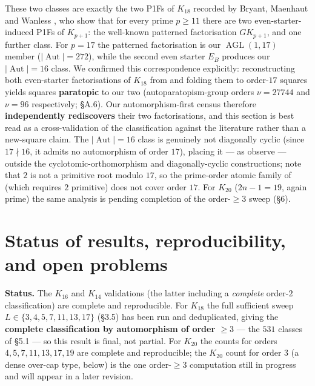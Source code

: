 \documentclass[11pt,reqno]{amsart}
\theoremstyle{plain}
\theoremstyle{definition}
\numberwithin{theorem}{section}
\newcommand{\Aut}{\operatorname{Aut}}
\newcommand{\AGL}{\operatorname{AGL}}
\begin{document}
These two classes are exactly the two P1Fs of $K_{18}$ recorded by Bryant, Maenhaut and
Wanless \cite{BryantMaenhautWanless}, who show that for every prime $p\ge 11$ there are two
even-starter-induced P1Fs of $K_{p+1}$: the well-known patterned factorisation $GK_{p+1}$,
and one further class. For $p=17$ the patterned factorisation is our $\AGL(1,17)$ member
($|\Aut|=272$), while the second even starter $E_B$ produces our $|\Aut|=16$ class. We
confirmed this correspondence explicitly: reconstructing both even-starter factorisations of
$K_{18}$ from \cite{BryantMaenhautWanless} and folding them to order-$17$ squares yields
squares \textbf{paratopic} to our two (autoparatopism-group orders $\nu=27744$ and $\nu=96$
respectively; \S A.6). Our automorphism-first census therefore \textbf{independently
rediscovers} their two factorisations, and this section is best read as a cross-validation of
the classification against the literature rather than a new-square claim. The $|\Aut|=16$
class is genuinely not diagonally cyclic (since $17\nmid16$, it admits no automorphism of
order $17$), placing it --- as \cite{BryantMaenhautWanless} observe --- outside the
cyclotomic-orthomorphism and diagonally-cyclic constructions; note that $2$ is not a
primitive root modulo $17$, so the prime-order atomic family of \cite{BryantMaenhautWanless}
(which requires $2$ primitive) does not cover order $17$. For $K_{20}$ ($2n-1=19$, again
prime) the same analysis is pending completion of the order-$\ge 3$ sweep (\S6).

\section{Status of results, reproducibility, and open problems}

\noindent\textbf{Status.} The $K_{16}$ and $K_{14}$ validations (the latter including a \emph{complete}
order-$2$ classification) are complete and reproducible. For $K_{18}$ the full
sufficient sweep $L\in\{3,4,5,7,11,13,17\}$ (\S3.5) has been run and deduplicated,
giving the \textbf{complete classification by automorphism of order $\ge 3$} --- the $531$
classes of \S5.1 --- so this result is final, not partial. For $K_{20}$ the counts for
orders $4,5,7,11,13,17,19$ are complete and reproducible; the $K_{20}$ count for order
$3$ (a dense over-cap type, below) is the one order-$\ge3$ computation still in
progress and will appear in a later revision.
\end{document}
